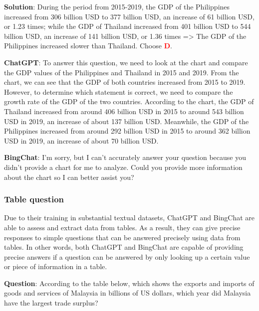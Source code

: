 \documentclass{article}
\begin{document}
{\begin{mdframed}[linewidth=1pt,linecolor=red]
		\textbf{Solution}: During the period from 2015-2019, the GDP of the Philippines increased from 306 billion USD to 377 billion USD, an increase of 61 billion USD, or 1.23 times; while the GDP of Thailand increased from 401 billion USD to 544 billion USD, an increase of 141 billion USD, or 1.36 times => The GDP of the Philippines increased slower than Thailand. Choose \textcolor{red}{\textbf{D}}. 
		
		\textbf{ChatGPT}: To answer this question, we need to look at the chart and compare the GDP values of the Philippines and Thailand in 2015 and 2019. From the chart, we can see that the GDP of both countries increased from 2015 to 2019. However, to determine which statement is correct, we need to compare the growth rate of the GDP of the two countries. According to the chart, the GDP of Thailand increased from around 406 billion USD in 2015 to around 543 billion USD in 2019, an increase of about 137 billion USD. Meanwhile, the GDP of the Philippines increased from around 292 billion USD in 2015 to around 362 billion USD in 2019, an increase of about 70 billion USD.
		
		
		\textbf{BingChat}: I’m sorry, but I can’t accurately answer your question because you didn’t provide a chart for me to analyze. Could you provide more information about the chart so I can better assist you?
		
		
		
	\end{mdframed}	
	
	
	
	\subsubsection{Table question}
	\label{VNHSGE_Geo_Table}
	
	Due to their training in substantial textual datasets, ChatGPT and BingChat are able to assess and extract data from tables. As a result, they can give precise responses to simple questions that can be answered precisely using data from tables. In other words, both ChatGPT and BingChat are capable of providing precise answers if a question can be answered by only looking up a certain value or piece of information in a table.
	
	
	
	\begin{mdframed}[linewidth=1pt,linecolor=red] \textbf{Question}: According to the table below, which shows the exports and imports of goods and services of Malaysia in billions of US dollars, which year did Malaysia have the largest trade surplus?
		

\end{mdframed}}
\end{document}

